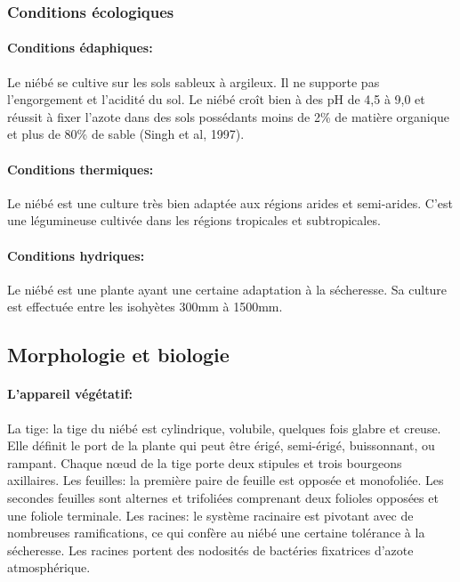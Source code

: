 \documentclass[a4paper,11pt]{article}
\begin{document}
\subsubsection{Conditions écologiques}

\paragraph{Conditions édaphiques:}

Le niébé se cultive sur les sols sableux à argileux. Il ne supporte
pas l’engorgement et l’acidité du sol. Le niébé croît bien à des pH de
4,5 à 9,0 et réussit à fixer l’azote dans des sols possédants moins de
2\% de matière organique et plus de 80\% de sable (Singh et al,
1997)\cite{Doggett_1988}.

\paragraph{Conditions thermiques:}

Le niébé est une culture très bien adaptée aux régions arides et
semi-arides. C’est une légumineuse cultivée dans les régions
tropicales et subtropicales\cite{Doggett_1988}.

\paragraph{Conditions hydriques:}

Le niébé est une plante ayant une certaine adaptation à la
sécheresse. Sa culture est effectuée entre les isohyètes 300mm à
1500mm\cite{Doggett_1988}.

\subsection{Morphologie et biologie}

  
\paragraph{L’appareil végétatif:}

La tige: la tige du niébé est cylindrique, volubile, quelques fois
glabre et creuse. Elle définit le port de la plante qui peut être
érigé, semi-érigé, buissonnant, ou rampant. Chaque nœud de la tige
porte deux stipules et trois bourgeons axillaires.  Les feuilles: la
première paire de feuille est opposée et monofoliée. Les secondes
feuilles sont alternes et trifoliées comprenant deux folioles opposées
et une foliole terminale.  Les racines: le système racinaire est
pivotant avec de nombreuses ramifications, ce qui confère au niébé une
certaine tolérance à la sécheresse. Les racines portent des nodosités
de bactéries fixatrices d’azote atmosphérique.
\end{document}
